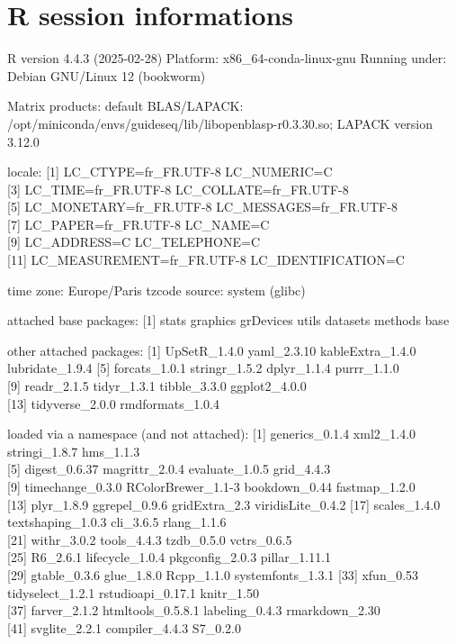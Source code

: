 \documentclass[
]{article}
\begin{document}
\section{R session informations}\label{r-session-informations}

R version 4.4.3 (2025-02-28) Platform: x86\_64-conda-linux-gnu Running
under: Debian GNU/Linux 12 (bookworm)

Matrix products: default BLAS/LAPACK:
/opt/miniconda/envs/guideseq/lib/libopenblasp-r0.3.30.so; LAPACK version
3.12.0

locale: {[}1{]} LC\_CTYPE=fr\_FR.UTF-8 LC\_NUMERIC=C\\
{[}3{]} LC\_TIME=fr\_FR.UTF-8 LC\_COLLATE=fr\_FR.UTF-8\\
{[}5{]} LC\_MONETARY=fr\_FR.UTF-8 LC\_MESSAGES=fr\_FR.UTF-8\\
{[}7{]} LC\_PAPER=fr\_FR.UTF-8 LC\_NAME=C\\
{[}9{]} LC\_ADDRESS=C LC\_TELEPHONE=C\\
{[}11{]} LC\_MEASUREMENT=fr\_FR.UTF-8 LC\_IDENTIFICATION=C

time zone: Europe/Paris tzcode source: system (glibc)

attached base packages: {[}1{]} stats graphics grDevices utils datasets
methods base

other attached packages: {[}1{]} UpSetR\_1.4.0 yaml\_2.3.10
kableExtra\_1.4.0 lubridate\_1.9.4 {[}5{]} forcats\_1.0.1 stringr\_1.5.2
dplyr\_1.1.4 purrr\_1.1.0\\
{[}9{]} readr\_2.1.5 tidyr\_1.3.1 tibble\_3.3.0 ggplot2\_4.0.0\\
{[}13{]} tidyverse\_2.0.0 rmdformats\_1.0.4

loaded via a namespace (and not attached): {[}1{]} generics\_0.1.4
xml2\_1.4.0 stringi\_1.8.7 hms\_1.1.3\\
{[}5{]} digest\_0.6.37 magrittr\_2.0.4 evaluate\_1.0.5 grid\_4.4.3\\
{[}9{]} timechange\_0.3.0 RColorBrewer\_1.1-3 bookdown\_0.44
fastmap\_1.2.0\\
{[}13{]} plyr\_1.8.9 ggrepel\_0.9.6 gridExtra\_2.3 viridisLite\_0.4.2
{[}17{]} scales\_1.4.0 textshaping\_1.0.3 cli\_3.6.5 rlang\_1.1.6\\
{[}21{]} withr\_3.0.2 tools\_4.4.3 tzdb\_0.5.0 vctrs\_0.6.5\\
{[}25{]} R6\_2.6.1 lifecycle\_1.0.4 pkgconfig\_2.0.3 pillar\_1.11.1\\
{[}29{]} gtable\_0.3.6 glue\_1.8.0 Rcpp\_1.1.0 systemfonts\_1.3.1
{[}33{]} xfun\_0.53 tidyselect\_1.2.1 rstudioapi\_0.17.1 knitr\_1.50\\
{[}37{]} farver\_2.1.2 htmltools\_0.5.8.1 labeling\_0.4.3
rmarkdown\_2.30\\
{[}41{]} svglite\_2.2.1 compiler\_4.4.3 S7\_0.2.0
\end{document}

